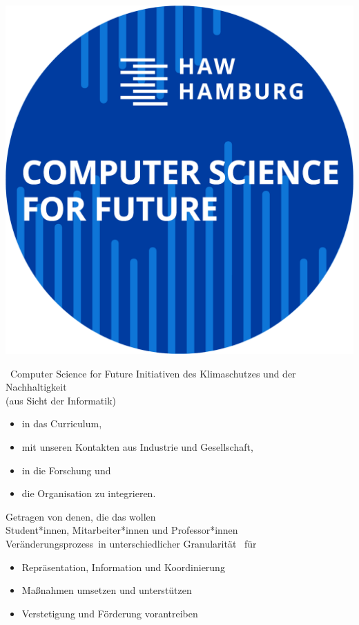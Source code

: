 
\begin{frame}{}
\hspace*{\fill}
\includegraphics[width=.8\textwidth]{../Figures/CS4Flogo.png}

\hspace*{\fill}
\end{frame}

\begin{frame}{\CSfF \ Computer Science for Future}
Initiativen  des Klimaschutzes und der Nachhaltigkeit  \\\hspace*{\fill}           (aus Sicht der Informatik)

\begin{itemize}
	\item in das Curriculum,
	\item mit unseren Kontakten aus Industrie und Gesellschaft,
	\item in die Forschung und
	\item die Organisation zu integrieren.
\end{itemize}
\vfill


Getragen von denen, die das wollen\\
Student*innen, Mitarbeiter*innen und Professor*innen\\ \vfill
Veränderungsprozess in unterschiedlicher Granularität \CSfF \ für
\begin{itemize}
	\item Repräsentation, Information und Koordinierung
	\item Maßnahmen umsetzen und unterstützen
	\item Verstetigung und Förderung vorantreiben
	\end{itemize}
\end{frame}


